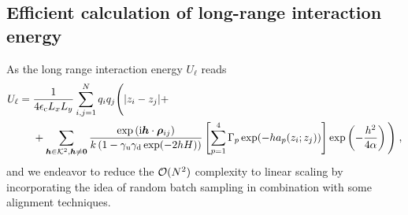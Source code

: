 \subsection{Efficient calculation of long-range interaction energy}
As the long range interaction  energy $U_\ell$ reads
\begin{align*} 
U_\ell&=\frac{1}{4\epsilon_{\mathrm{c}} L_xL_y}\sum_{i,j=1}^N q_iq_j\Bigg({\left\lvert z_i-z_j\right\rvert} +\\&~~~~+  \sum_{\boldsymbol{h}\in\mathcal{K}^2,\boldsymbol{h}\neq\bm{0}} \frac{ \exp{(\mathrm{i} \boldsymbol{h} \cdot \boldsymbol{\rho}_{ij})}}{k\left(1-\gamma_{\mathrm{u}}\gamma_{\mathrm{d}}\exp(-2hH)\right)}\left[\sum_{p=1}^4\Gamma_p\exp(-ha_p(z_i;z_j))\right] \exp\left(-\frac{h^2}{4\alpha}\right)\Bigg)\;,
\end{align*}
and we endeavor to  reduce the $\mathcal{O}(N^2)$ complexity to linear scaling by incorporating the idea of random batch sampling in combination with some alignment techniques.


